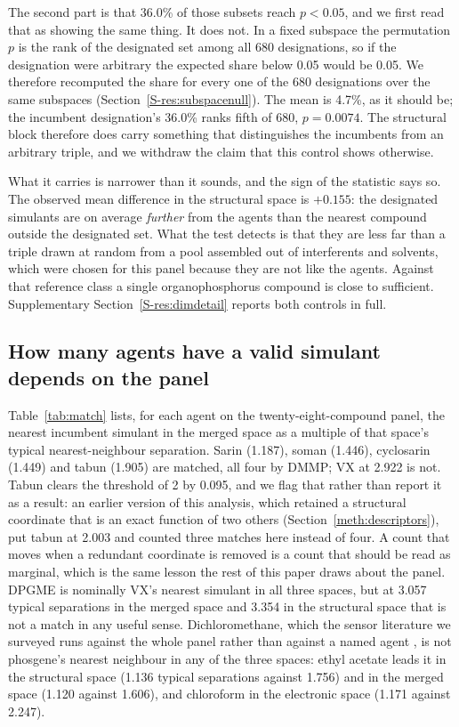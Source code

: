 \documentclass[1p,times]{elsarticle}
\begin{document}
The second part is that 36.0\% of those subsets reach $p<0.05$, and we first
read that as showing the same thing. It does not. In a fixed subspace the
permutation $p$ is the rank of the designated set among all 680 designations, so
if the designation were arbitrary the expected share below 0.05 would be 0.05.
We therefore recomputed the share for every one of the 680 designations over the
same subspaces (Section~\ref{S-res:subspacenull}). The mean is 4.7\%, as it
should be; the incumbent designation's 36.0\% ranks fifth of 680, $p=0.0074$.
The structural block therefore does carry something that distinguishes the
incumbents from an arbitrary triple, and we withdraw the claim that this control
shows otherwise.

What it carries is narrower than it sounds, and the sign of the statistic says
so. The observed mean difference in the structural space is $+0.155$: the
designated simulants are on average \emph{further} from the agents than the
nearest compound outside the designated set. What the test detects is that they
are less far than a triple drawn at random from a pool assembled out of
interferents and solvents, which were chosen for this panel because they are not
like the agents. Against that reference class a single organophosphorus compound
is close to sufficient. Supplementary Section~\ref{S-res:dimdetail} reports
both controls in full.

\subsection{How many agents have a valid simulant depends on the panel}
\label{res:match}

Table~\ref{tab:match} lists, for each agent on the twenty-eight-compound panel,
the nearest incumbent simulant in the merged space as a multiple of that space's
typical nearest-neighbour separation. Sarin (1.187), soman (1.446),
cyclosarin (1.449) and tabun (1.905) are matched, all four by DMMP; VX at
2.922 is not. Tabun clears the threshold of 2 by 0.095, and we flag that rather
than report it as a result: an earlier version of this analysis, which retained
a structural coordinate that is an exact function of two others
(Section~\ref{meth:descriptors}), put tabun at 2.003 and counted three matches
here instead of four. A count that moves when a redundant coordinate is removed
is a count that should be read as marginal, which is the same lesson the rest of
this paper draws about the panel. DPGME is nominally VX's nearest simulant in all three spaces, but
at 3.057 typical separations in the merged space and 3.354 in the structural
space that is not a match in any useful sense. Dichloromethane, which the
sensor literature we surveyed runs against the whole panel rather than against a
named agent \cite{lee2011sno2}, is not phosgene's nearest neighbour in any of the
three spaces: ethyl acetate leads it in the structural space (1.136 typical
separations against 1.756) and in the merged space (1.120 against 1.606), and
chloroform in the electronic space (1.171 against 2.247).
\end{document}
